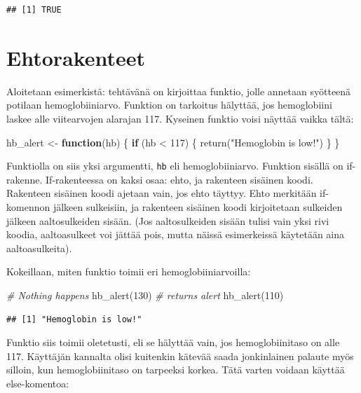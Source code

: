 \documentclass[
]{book}
\newenvironment{Shaded}{\begin{snugshade}}{\end{snugshade}}
\newcommand{\CommentTok}[1]{\textcolor[rgb]{0.56,0.35,0.01}{\textit{#1}}}
\newcommand{\ControlFlowTok}[1]{\textcolor[rgb]{0.13,0.29,0.53}{\textbf{#1}}}
\newcommand{\DecValTok}[1]{\textcolor[rgb]{0.00,0.00,0.81}{#1}}
\newcommand{\FunctionTok}[1]{\textcolor[rgb]{0.00,0.00,0.00}{#1}}
\newcommand{\NormalTok}[1]{#1}
\newcommand{\OtherTok}[1]{\textcolor[rgb]{0.56,0.35,0.01}{#1}}
\newcommand{\SpecialCharTok}[1]{\textcolor[rgb]{0.00,0.00,0.00}{#1}}
\newcommand{\StringTok}[1]{\textcolor[rgb]{0.31,0.60,0.02}{#1}}
\begin{document}
\begin{verbatim}
## [1] TRUE
\end{verbatim}

\hypertarget{ehtorakenteet}{%
\section{Ehtorakenteet}\label{ehtorakenteet}}

Aloitetaan esimerkistä: tehtävänä on kirjoittaa funktio, jolle annetaan syötteenä potilaan hemoglobiiniarvo. Funktion on tarkoitus hälyttää, jos hemoglobiini laskee alle viitearvojen alarajan 117. Kyseinen funktio voisi näyttää vaikka tältä:

\begin{Shaded}
\begin{Highlighting}[]
\NormalTok{hb\_alert }\OtherTok{\textless{}{-}} \ControlFlowTok{function}\NormalTok{(hb) \{}
  \ControlFlowTok{if}\NormalTok{ (hb }\SpecialCharTok{\textless{}} \DecValTok{117}\NormalTok{) \{}
    \FunctionTok{return}\NormalTok{(}\StringTok{"Hemoglobin is low!"}\NormalTok{)}
\NormalTok{  \}}
\NormalTok{\}}
\end{Highlighting}
\end{Shaded}

Funktiolla on siis yksi argumentti, \texttt{hb} eli hemoglobiiniarvo. Funktion sisällä on if-rakenne. If-rakenteessa on kaksi osaa: ehto, ja rakenteen sisäinen koodi. Rakenteen sisäinen koodi ajetaan vain, jos ehto täyttyy. Ehto merkitään if-komennon jälkeen sulkeisiin, ja rakenteen sisäinen koodi kirjoitetaan sulkeiden jälkeen aaltosulkeiden sisään. (Jos aaltosulkeiden sisään tulisi vain yksi rivi koodia, aaltoasulkeet voi jättää pois, mutta näissä esimerkeissä käytetään aina aaltoasulkeita).

Kokeillaan, miten funktio toimii eri hemoglobiiniarvoilla:

\begin{Shaded}
\begin{Highlighting}[]
\CommentTok{\# Nothing happens}
\FunctionTok{hb\_alert}\NormalTok{(}\DecValTok{130}\NormalTok{)}
\CommentTok{\# returns alert}
\FunctionTok{hb\_alert}\NormalTok{(}\DecValTok{110}\NormalTok{)}
\end{Highlighting}
\end{Shaded}

\begin{verbatim}
## [1] "Hemoglobin is low!"
\end{verbatim}

Funktio siis toimii oletetusti, eli se hälyttää vain, jos hemoglobiinitaso on alle 117. Käyttäjän kannalta olisi kuitenkin kätevää saada jonkinlainen palaute myös silloin, kun hemoglobiinitaso on tarpeeksi korkea. Tätä varten voidaan käyttää else-komentoa:
\end{document}
